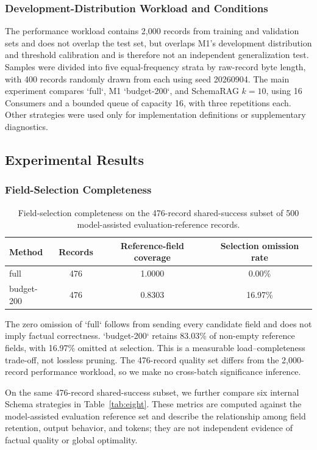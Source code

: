 \documentclass[runningheads]{llncs}
\newcommand{\method}{M1}
\newcommand{\schemarag}{SchemaRAG}
\begin{document}
\subsubsection{Development-Distribution Workload and Conditions}

The performance workload contains 2,000 records from training and validation sets and does not overlap the test set, but overlaps \method{}'s development distribution and threshold calibration and is therefore not an independent generalization test. Samples were divided into five equal-frequency strata by raw-record byte length, with 400 records randomly drawn from each using seed 20260904. The main experiment compares `full`, \method{} `budget-200`, and \schemarag{} $k=10$, using 16 Consumers and a bounded queue of capacity 16, with three repetitions each. Other strategies were used only for implementation definitions or supplementary diagnostics.

\subsection{Experimental Results}
\subsubsection{Field-Selection Completeness}

\begin{table}[htbp]\centering\small
\caption{Field-selection completeness on the 476-record shared-success subset of 500 model-assisted evaluation-reference records.}\label{tab:coverage}
\begin{tabular}{@{}lccc@{}}\toprule
Method & Records & Reference-field coverage & Selection omission rate\\\midrule
full & 476 & 1.0000 & 0.00\%\\
budget-200 & 476 & 0.8303 & 16.97\%\\\bottomrule
\end{tabular}\end{table}

The zero omission of `full` follows from sending every candidate field and does not imply factual correctness. `budget-200` retains 83.03\% of non-empty reference fields, with 16.97\% omitted at selection. This is a measurable load--completeness trade-off, not lossless pruning. The 476-record quality set differs from the 2,000-record performance workload, so we make no cross-batch significance inference.

On the same 476-record shared-success subset, we further compare six internal Schema strategies in Table~\ref{tab:eight}. These metrics are computed against the model-assisted evaluation reference set and describe the relationship among field retention, output behavior, and tokens; they are not independent evidence of factual quality or global optimality.
\end{document}

